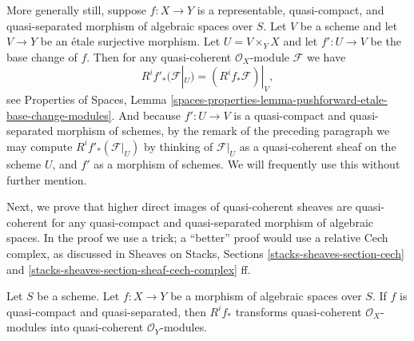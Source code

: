 \medskip\noindent
More generally still, suppose $f : X \to Y$ is a
representable, quasi-compact, and
quasi-separated morphism of algebraic spaces over $S$. Let $V$ be a scheme
and let $V \to Y$ be an \'etale surjective morphism. Let $U = V \times_Y X$
and let $f' : U \to V$ be the base change of $f$. Then for any
quasi-coherent $\mathcal{O}_X$-module $\mathcal{F}$ we have
\begin{equation}
\label{equation-representable-higher-direct-image}
R^if'_*(\mathcal{F}|_U) = (R^if_*\mathcal{F})|_V,
\end{equation}
see
Properties of Spaces,
Lemma \ref{spaces-properties-lemma-pushforward-etale-base-change-modules}.
And because $f' : U \to V$ is a quasi-compact and quasi-separated
morphism of schemes, by the remark of the preceding paragraph we may
compute $R^if'_*(\mathcal{F}|_U)$ by thinking of $\mathcal{F}|_U$ as a
quasi-coherent sheaf on the scheme $U$, and $f'$ as a morphism of schemes.
We will frequently use this without further mention.

\medskip\noindent
Next, we prove that higher direct images of quasi-coherent sheaves are
quasi-coherent for any quasi-compact and quasi-separated morphism of
algebraic spaces. In the proof we use a trick; a ``better'' proof would
use a relative Cech complex, as discussed in
Sheaves on Stacks, Sections \ref{stacks-sheaves-section-cech} and
\ref{stacks-sheaves-section-sheaf-cech-complex} ff.

\begin{lemma}
\label{lemma-higher-direct-image}
Let $S$ be a scheme. Let $f : X \to Y$ be a morphism of algebraic spaces
over $S$. If $f$ is quasi-compact and quasi-separated, then $R^if_*$
transforms quasi-coherent $\mathcal{O}_X$-modules into
quasi-coherent $\mathcal{O}_Y$-modules.
\end{lemma}

